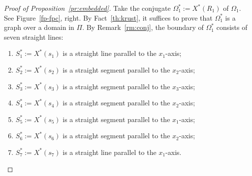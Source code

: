 \documentclass[11pt]{amsart}
\numberwithin{equation}{section}
\numberwithin{figure}{section}
\theoremstyle{plain} %
\theoremstyle{definition} %
\begin{document}
\begin{proof}[Proof of Proposition~\ref{pr:embedded}]
Take the conjugate $\Omega_1^*:=X^*(R_1)$ of $\Omega_1$. 
See Figure~\ref{fp-fpc}, right.
By Fact~\ref{th:krust}, it suffices to prove that $\Omega_1^*$ is a graph over a domain in $\Pi$.
By Remark~\ref{rm:conj}, 
the boundary of $\Omega_1^*$ consists of seven straight lines:
\begin{enumerate}
\item
$S_1^*:=X^*(s_1)$ is a straight line parallel to the $x_1$-axis;
\item
$S_2^*:=X^*(s_2)$ is a straight segment parallel to the $x_2$-axis;
\item
$S_3^*:=X^*(s_3)$ is a straight segment parallel to the $x_3$-axis;
\item
$S_4^*:=X^*(s_4)$ is a straight segment parallel to the $x_2$-axis;
\item
$S_5^*:=X^*(s_5)$ is a straight segment parallel to the $x_1$-axis;
\item
$S_6^*:=X^*(s_6)$ is a straight segment parallel to the $x_2$-axis;
\item
$S_7^*:=X^*(s_7)$ is a straight line parallel to the $x_1$-axis. 
\end{enumerate}


\end{proof}
\end{document}
